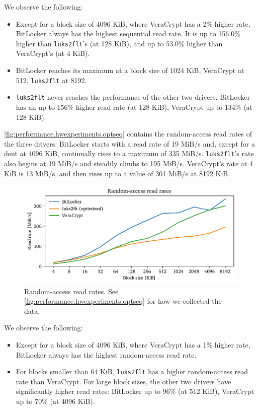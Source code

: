 We observe the following:
\begin{itemize}[beginpenalty=10000]
	\item Except for a block size of 4096 KiB, where VeraCrypt has a 2\% higher rate, BitLocker always has the highest sequential read rate. It is up to 156.0\% higher than \texttt{luks2flt}'s (at 128 KiB), and up to 53.0\% higher than VeraCrypt's (at 4 KiB).
	\item BitLocker reaches its maximum at a block size of 1024 KiB, VeraCrypt at 512, \texttt{luks2flt} at 8192.
	\item \texttt{luks2flt} never reaches the performance of the other two drivers. BitLocker has an up to 156\% higher read rate (at 128 KiB), VeraCrypt up to 134\% (at 128 KiB).
\end{itemize}

\autoref{fig:performance.hwexperiments.optseq} contains the random-access read rates of the three drivers. BitLocker starts with a read rate of 19 MiB/s and, except for a dent at 4096 KiB, continually rises to a maximum of 335 MiB/s. \texttt{luks2flt}'s rate also begins at 19 MiB/s and steadily climbs to 195 MiB/s. VeraCrypt's rate at 4 KiB is 13 MiB/s, and then rises up to a value of 301 MiB/s at 8192 KiB. 

\begin{figure}[htb!]
	\center
	\includegraphics[scale=1]{../fig/performance.hwexperiments.optrand.pdf}
	\caption[
		Random-access read rates
	]{
		Random-access read rates. See \autoref{fig:performance.hwexperiments.optseq} for how we collected the data.
	}
	\label{fig:performance.hwexperiments.optrand}
\end{figure}

We observe the following:
\begin{itemize}[beginpenalty=10000]
	\item Except for a block size of 4096 KiB, where VeraCrypt has a 1\% higher rate, BitLocker always has the highest random-access read rate.
	\item For blocks smaller than 64 KiB, \texttt{luks2flt} has a higher random-access read rate than VeraCrypt. For large block sizes, the other two drivers have significantly higher read rates: BitLocker up to 96\% (at 512 KiB), VeraCrypt up to 70\% (at 4096 KiB).
\end{itemize}

